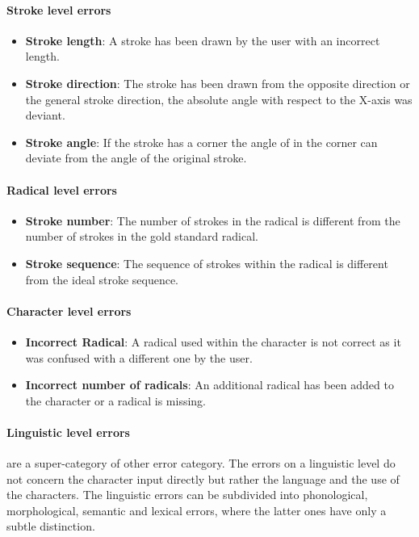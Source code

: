 \paragraph{Stroke level errors} 
\begin{itemize}
\item \textbf{Stroke length}: A stroke has been drawn by the user with an 
      incorrect length.
\item \textbf{Stroke direction}: The stroke has been drawn from the opposite
      direction or the general stroke direction, the absolute angle with respect 
      to the X-axis was deviant.
\item \textbf{Stroke angle}: If the stroke has a corner the angle of in the
      corner can deviate from the angle of the original stroke.
\end{itemize}

\paragraph{Radical level errors}
\begin{itemize}
\item \textbf{Stroke number}: The number of strokes in the radical is different
      from the number of strokes in the gold standard radical.
\item \textbf{Stroke sequence}: The sequence of strokes within the radical
      is different from the ideal stroke sequence.
\end{itemize}

\paragraph{Character level errors}
\begin{itemize}
\item \textbf{Incorrect Radical}: A radical used within the character is not
      correct as it was confused with a different one by the user.
\item \textbf{Incorrect number of radicals}: An additional radical has been 
      added to the character or a radical is missing.
\end{itemize}

\paragraph{Linguistic level errors} are a super-category of other error category.
The errors on a linguistic level do not concern the character input directly
but rather the language and the use of the characters. The linguistic errors
can be subdivided into phonological, morphological, semantic and lexical errors,
where the latter ones have only a subtle distinction.

